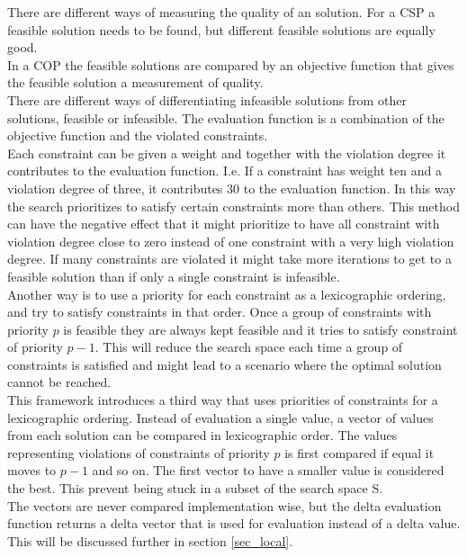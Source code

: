 There are different ways of measuring the quality of an solution. For a CSP a feasible solution needs to be found, but 
different feasible solutions are equally good.  \\
In a COP the feasible solutions are compared by an objective function that gives the feasible solution a measurement 
of quality. \\ 
There are different ways of differentiating infeasible solutions from other solutions, feasible or infeasible. The 
evaluation function is a combination of the objective function and the violated constraints. \\ 
Each constraint can be given a weight and together with the violation degree it contributes to the evaluation function. 
I.e. If a constraint has weight ten and a violation degree of three, it contributes $30$ to the evaluation function. In 
this way the search prioritizes to satisfy certain constraints more than others. This method can have the 
negative effect that it might prioritize to have all constraint with violation degree close to zero instead of 
one constraint with a very high violation degree. If many constraints are violated it might take more iterations to get 
to a feasible solution than if only a single constraint is infeasible. \\ 
Another way is to use a priority for each constraint as a lexicographic ordering, and try to satisfy constraints in 
that order. Once a group of constraints with priority $p$ is feasible they are always kept feasible and it tries to 
satisfy constraint of priority $p-1$. This will reduce the search space each time a group of constraints is satisfied 
and might lead to a scenario where the optimal solution cannot be reached. \\ 
This framework introduces a third way that uses priorities of constraints for a lexicographic ordering. Instead of 
evaluation a single value, a vector of values from each solution can be compared in lexicographic order. The values 
representing violations of constraints of priority $p$ is first compared if equal it moves to $p-1$ and so on. The 
first vector to have a smaller value is considered the best. This prevent being stuck in a subset of the search 
space S. \\ 
The vectors are never compared implementation wise, but the delta evaluation function returns a delta vector 
that is used for evaluation instead of a delta value. This will be discussed further in section \ref{sec_local}.